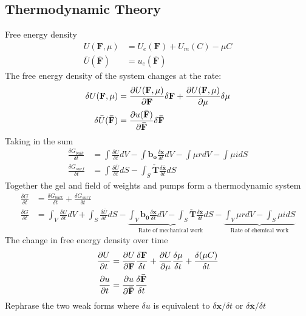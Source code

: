 \documentclass[12pt,3p]{article}
\numberwithin{equation}{section}
\begin{document}
\subsection{Thermodynamic Theory}
Free energy density
\begin{align*}
U (\mathbf{F}, \mu) &= U_e (\mathbf{F}) + U_m (C) - \mu C \\
\bar{U} (\mathbf{\bar{F}}) &= u_e  (\mathbf{\bar{F}}) 
\end{align*}
The free energy density of the system changes at the rate: 
\begin{align*}
\delta U (\mathbf{F}, \mu) &= \pdv{U (\mathbf{F}, \mu)}{\mathbf{F}} \delta \mathbf{F}+ \pdv{U (\mathbf{F}, \mu)}{\mu} \delta \mu \\
\delta \bar{U} (\mathbf{\bar{F}}) &=  \pdv{u (\mathbf{\bar{F}})}{\mathbf{\bar{F}}} \delta \mathbf{\bar{F}}
\end{align*}
Taking in the sum 
\begin{align*}
 \frac{\delta G_{bulk}}{\delta t} &= \int \frac{\delta U}{\delta t} dV  - \int \mathbf{b_o} \frac{\delta \mathbf{x}}{\delta t} dV - \int \mu r dV - \int \mu i dS \\
\frac{\delta G_{surf}}{\delta t} &= \int \frac{\delta \bar{U}}{\delta t} dS - \int_{S} \check{\mathbf{T}} \frac{\delta \overline{\mathbf{x}}}{\delta t} d S 
\end{align*}
Together the gel and field of weights and pumps form a thermodynamic system
\begin{align*}
\frac{\delta G}{\delta t} &= \frac{\delta G_{bulk}}{\delta t} + \frac{\delta G_{surf}}{\delta t} \\
\frac{\delta G}{\delta t} &= \int_{V} \frac{\delta U}{\delta t} d V + \int_{S} \frac{\delta \bar{U}}{\delta t} d S - 
\underbrace{\int_{V} \mathbf{b}_{\mathbf{0}} \frac{\delta \mathbf{x}}{\delta t} d V - \int_{S} \check{\mathbf{T}} \frac{\delta \overline{\mathbf{x}}}{\delta t} d S}_\text{Rate of mechanical work}
- \underbrace{\int_{V} \mu r d V-\int_{S} \mu i d S}_\text{Rate of chemical work} 
\end{align*}
The change in free energy density over time 
\begin{align*}
\pdv{U}{t} &= \pdv{U}{\mathbf{F}} \frac{\delta \mathbf{F}}{\delta t}+ \pdv{U}{\mu} \frac{\delta \mu}{\delta t} + \frac{\delta (\mu C)}{\delta t} \\
\pdv{u}{t} &= \pdv{u}{\mathbf{\bar{F}}} \frac{\delta \mathbf{\bar{F}}}{\delta t}
\end{align*}
Rephrase the two weak forms where $\delta u$ is equivalent to $\delta \mathbf{x} / \delta t$ or $\delta \mathbf{\bar{x}} / \delta t $
\end{document}
